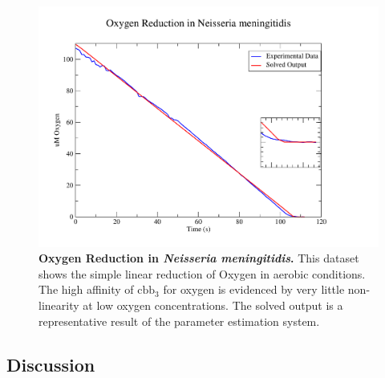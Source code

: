 \begin{figure}[tbp]
 \centering
 \includegraphics[width=14cm]{./05-oxygenreduction/data/o2sim.pdf}
 \caption[{Oxygen Reduction in \textit{Neisseria meningitidis}.}]{{\bf Oxygen Reduction in \textit{Neisseria meningitidis}.} This dataset shows the simple linear reduction of Oxygen in aerobic conditions. The high affinity of $\mathrm{cbb}_3$ for oxygen is evidenced by very little non-linearity at low oxygen concentrations. The solved output is a representative result of the parameter estimation system.
 \label{fig:o2sim}}
\end{figure}



\subsection{Discussion}